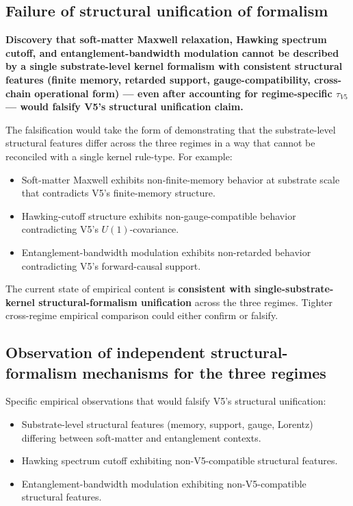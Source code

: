 \documentclass[11pt,a4paper]{article}
\begin{document}
\subsection{Failure of structural unification of formalism}

\textbf{Discovery that soft-matter Maxwell relaxation, Hawking spectrum cutoff, and entanglement-bandwidth modulation cannot be described by a single substrate-level kernel formalism with consistent structural features (finite memory, retarded support, gauge-compatibility, cross-chain operational form) --- even after accounting for regime-specific $\tau_{V5}$ --- would falsify V5's structural unification claim.}

The falsification would take the form of demonstrating that the substrate-level structural features differ across the three regimes in a way that cannot be reconciled with a single kernel rule-type. For example:

\begin{itemize}[noitemsep]
\item Soft-matter Maxwell exhibits non-finite-memory behavior at substrate scale that contradicts V5's finite-memory structure.
\item Hawking-cutoff structure exhibits non-gauge-compatible behavior contradicting V5's $U(1)$-covariance.
\item Entanglement-bandwidth modulation exhibits non-retarded behavior contradicting V5's forward-causal support.
\end{itemize}

The current state of empirical content is \textbf{consistent with single-substrate-kernel structural-formalism unification} across the three regimes. Tighter cross-regime empirical comparison could either confirm or falsify.

\subsection{Observation of independent structural-formalism mechanisms for the three regimes}

Specific empirical observations that would falsify V5's structural unification:

\begin{itemize}[noitemsep]
\item Substrate-level structural features (memory, support, gauge, Lorentz) differing between soft-matter and entanglement contexts.
\item Hawking spectrum cutoff exhibiting non-V5-compatible structural features.
\item Entanglement-bandwidth modulation exhibiting non-V5-compatible structural features.
\end{itemize}
\end{document}
